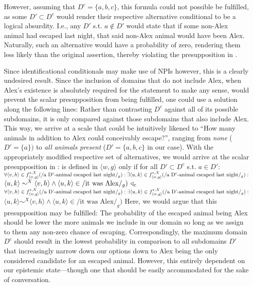 \xe
However, assuming that $D^c=\{a,b,c\}$, this formula could not possible be fulfilled, as some $D'\subset D^c$ would render their respective alternative conditional to be a logical absurdity. I.e., any $D'$ s.t. $a\not\in D'$ would state that if some non-Alex animal had escaped last night, that said non-Alex animal would have been Alex. Naturally, such an alternative would have a probability of zero, rendering them less likely than the original assertion, thereby violating the presupposition in . 

Since identificational conditionals may make use of NPIs however, this is a clearly undesired result. Since the inclusion of domains that do not include Alex, when Alex's existence is absolutely required for the statement to make any sense, would prevent the scalar presupposition from being fulfilled, one could use a solution along the following lines: Rather than contrasting $D^c$ against all of its possible subdomains, it is only compared against those subdomains that also include Alex. This way, we arrive at a scale that could be intuitively likened to \enquote{How many animals in addition to Alex could conceivably escape?}, ranging from \textit{none} ($D'=\{a\})$ to \textit{all animals present} ($D'=\{a,b,c\}$ in our case). With the appropriately modified respective set of alternatives, we would arrive at the scalar presupposition in :
\ex{}
{}\linebreak
is defined in $\langle w,g\rangle$ only if for all $D'\subset D^c$ s.t. $a\in D'$:\\
$\forall{\langle v,h\rangle\in f^{*,X}_{\langle w,g\rangle}(/\text{a D\textsuperscript{c}-animal escaped last night}/_g)}:\\\exists\langle u,k\rangle\in f^{*,X}_{\langle w,g\rangle}(/\text{a D\textsuperscript{c}-animal escaped last night}/_g):$\\\emptyfill$\langle u,k\rangle\sim^X\langle v,h\rangle\land\langle u,k\rangle\in/\text{it was Alex}/_g)~\triangleleft_c$\\
$\forall{\langle v,h\rangle\in f^{*,X}_{\langle w,g\rangle}(/\text{a D'-animal escaped last night}/_g)}:\\\exists\langle u,k\rangle\in f^{*,X}_{\langle w,g\rangle}(/\text{a D'-animal escaped last night}/_g):$\\\emptyfill$\langle u,k\rangle\sim^X\langle v,h\rangle\land\langle u,k\rangle\in/\text{it was Alex}/_g)$
\xe
Here, we would argue that this presupposition may be fulfilled: The probability of the escaped animal being Alex should be lower the more animals we include in our domain so long as we assign to them any non-zero chance of escaping. Correspondingly, the maximum domain $D^c$ should result in the lowest probability in comparison to all subdomains $D'$ that increasingly narrow down our options down to Alex being the only considered candidate for an escaped animal. However, this entirely dependent on our epistemic state---though one that should be easily accommodated for the sake of conversation.

